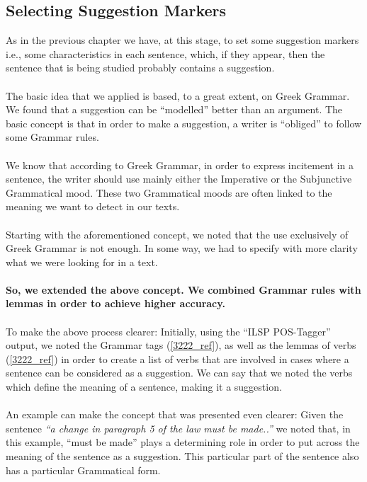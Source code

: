 \subsection{Selecting Suggestion Markers}\label{331_ref}
As in the previous chapter we have, at this stage, to set some suggestion markers i.e., some characteristics in each sentence, which, if they appear, then the sentence that is being studied probably contains a suggestion.\\
\\
The basic idea that we applied is based, to a great extent, on Greek Grammar. We found that a suggestion can be ``modelled'' better than an argument. The basic concept is that in order to make a suggestion, a writer is ``obliged'' to follow some Grammar rules.\\
\\
We know that according to Greek Grammar, in order to express incitement in a sentence, the writer should use mainly either the Imperative or the Subjunctive Grammatical mood. These two Grammatical moods are often linked to the meaning we want to detect in our texts.\\
\\
Starting with the aforementioned concept, we noted that the use exclusively of Greek Grammar is not enough. In some way, we had to specify with more clarity what we were looking for in a text.\\
\\
\textbf{So, we extended the above concept. We combined Grammar rules with lemmas in order to achieve higher accuracy.}\\
\\
To make the above process clearer: Initially, using the ``ILSP POS-Tagger'' output, we noted the Grammar tags (\ref{3222_ref}), as well as the lemmas of verbs (\ref{3222_ref}) in order to create a list of verbs that are involved in cases where a sentence can be considered  as a suggestion. We can say that we noted the verbs which define the meaning of a sentence, making it a suggestion.\\
\\
An example can make the concept that was presented even clearer: Given the sentence \textit{``a change in paragraph 5 of the law  must be made..''} we noted that, in this example, ``must be made'' plays a determining role in order to put across the meaning of the sentence as a suggestion. This particular part of the sentence also has a particular Grammatical form.\\

